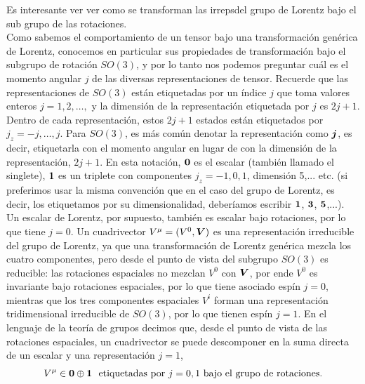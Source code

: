  Es interesante ver ver como se transforman las irrepsdel grupo de Lorentz bajo el sub grupo de las rotaciones.\\
 Como sabemos el comportamiento de un tensor bajo una transformación genérica de Lorentz, conocemos en particular sus propiedades de transformación bajo el subgrupo de rotación $SO(3)$, y por lo tanto nos podemos preguntar cuál es el momento angular $j$ de las diversas representaciones de tensor. Recuerde que las representaciones de $SO(3)$ están etiquetadas por un índice $j$ que toma valores enteros $j=1,2,\ldots,$ y la dimensión de la representación etiquetada por $j$ es $2j + 1$. Dentro de cada representación, estos $2j + 1$ estados están etiquetados por $j_{z}=-j,\ldots,j$. Para $SO(3)$, es más común denotar la representación como $\vb*{j}$, es decir, etiquetarla con el momento angular en lugar de con la dimensión de la representación, $2j+1$. En esta notación, $\vb*{0}$ es el escalar (también llamado el singlete), $\vb*{1}$ es un triplete con componentes $j_{z}=-1,0,1$, dimensión 5,... etc. (si preferimos usar la misma convención que en el caso del grupo de Lorentz, es decir, los etiquetamos por su dimensionalidad, deberíamos escribir $\vb*{1}$, $\vb*{3}$, $\vb*{5}$,...).\\

 Un escalar de Lorentz, por supuesto, también es escalar bajo rotaciones, por lo que tiene $j=0$. Un cuadrivector $V^{\mu}=(V^{0},\vb*{V})$ es una representación irreducible del grupo de Lorentz, ya que una transformación de Lorentz genérica mezcla los cuatro componentes, pero desde el punto de vista del subgrupo $SO(3)$ es reducible: las rotaciones espaciales no mezclan $V^{0}$ con $\vb*{V}$, por ende $V^{0}$ es invariante bajo rotaciones espaciales, por lo que tiene asociado espín $j = 0$, mientras que los tres componentes espaciales $V^{i}$ forman una representación tridimensional irreducible de $SO(3)$, por lo que tienen espín $j = 1$. En el lenguaje de la teoría de grupos decimos que, desde el punto de vista de las rotaciones espaciales, un cuadrivector se puede descomponer en la suma directa de un escalar y una representación $j = 1$,\\
 \begin{equation}
     V^{\mu} \in \vb*{0}\oplus \vb*{1} ~~ \text{etiquetadas por $j=0,1$ bajo el grupo de rotaciones}.
 \end{equation}


